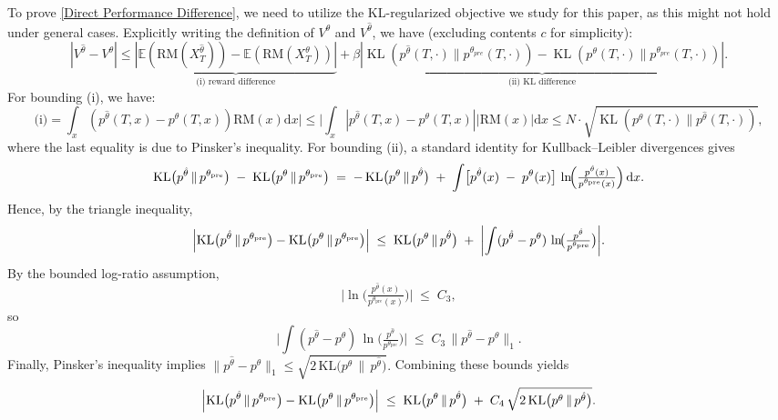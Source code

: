 \documentclass{article}
\theoremstyle{plain}
\theoremstyle{definition}
\theoremstyle{remark}
\begin{document}
To prove \eqref{Direct Performance Difference}, we need to utilize the KL-regularized objective we study for this paper, as this might not hold under general cases. Explicitly writing the definition of $V^{\theta}$ and $V^{\hat{\theta}}$, we have (excluding contents $c$ for simplicity):
$$
|V^{\hat{\theta}} - V^{\theta}|\leq \underbrace{|\mathbb{E}(\text{RM}(X^{\hat{\theta}}_T))-\mathbb{E}(\text{RM}(X^{\theta}_T))|}_{\text{(i) reward difference}}+\beta \underbrace{|\operatorname{KL}\left(p^{\hat{\theta}}(T,\cdot)\| p^{\theta_{pre}}(T,\cdot)\right)-\operatorname{KL}\left(p^{\theta}(T,\cdot)\| p^{\theta_{pre}}(T,\cdot)\right)|}_{\text{(ii) KL difference}}.
$$
For bounding (i), we have:
$$
\text{(i)} =\int_{x}(p^{\hat{\theta}}(T,x)-p^{\theta}(T,x))\text{RM}(x) \mathrm{d} x|\leq |\int_{x}|p^{\hat{\theta}}(T,x)-p^{\theta}(T,x)||\text{RM}(x)| \mathrm{d} x \leq N\cdot\sqrt{\operatorname{KL}\left(p^{\theta}(T,\cdot)\| p^{\hat{\theta}}(T,\cdot)\right)},
$$
where the last equality is due to Pinsker's inequality. For bounding (ii), a standard identity for Kullback--Leibler divergences gives
\[
  \mathrm{KL}\bigl(p^{\hat{\theta}} \,\|\, p^{\theta_{\mathrm{pre}}}\bigr)
  \;-\;
  \mathrm{KL}\bigl(p^{\theta} \,\|\, p^{\theta_{\mathrm{pre}}}\bigr)
  \;=\;
  -\,\mathrm{KL}\bigl(p^{\theta}\,\|\,p^{\hat{\theta}}\bigr)
  \;+\;
  \int \bigl[p^{\hat{\theta}}(x) \;-\; p^{\theta}(x)\bigr]
        \,\ln\!\Bigl(\tfrac{p^{\hat{\theta}}(x)}{p^{\theta_{\mathrm{pre}}}(x)}\Bigr)\,\mathrm{d}x.
\]
Hence, by the triangle inequality,
\[
  \Bigl|
     \mathrm{KL}\bigl(p^{\hat{\theta}} \,\|\, p^{\theta_{\mathrm{pre}}}\bigr)
     -
     \mathrm{KL}\bigl(p^{\theta}\,\|\,p^{\theta_{\mathrm{pre}}}\bigr)
  \Bigr|
  \;\le\;
  \mathrm{KL}\bigl(p^{\theta}\,\|\,p^{\hat{\theta}}\bigr)
  \;+\;
  \biggl|\int (p^{\hat{\theta}} - p^{\theta})\,
              \ln\!\bigl(\tfrac{p^{\hat{\theta}}}{p^{\theta_{\mathrm{pre}}}}\bigr)\biggr|.
\]
By the bounded log-ratio assumption,
\[
  \bigl|\ln\!\bigl(\tfrac{p^{\hat{\theta}}(x)}{p^{\theta_{\mathrm{pre}}}(x)}\bigr)\bigr|
  \;\le\;
  C_3,
\]
so
\[
  \biggl|\int (p^{\hat{\theta}} - p^{\theta})\,
               \ln\!\bigl(\tfrac{p^{\hat{\theta}}}{p^{\theta_{\mathrm{pre}}}}\bigr)\biggr|
  \;\le\;
  C_3 \,\|p^{\hat{\theta}} - p^{\theta}\|_1.
\]
Finally, Pinsker’s inequality implies
\(\|p^{\hat{\theta}} - p^{\theta}\|_1 \le \sqrt{2\,\mathrm{KL}\!\bigl(p^{\theta}\,\|\,p^{\hat{\theta}}\bigr)}.\)
Combining these bounds yields
\[
  \Bigl|
     \mathrm{KL}\bigl(p^{\hat{\theta}} \,\|\, p^{\theta_{\mathrm{pre}}}\bigr)
     -
     \mathrm{KL}\bigl(p^{\theta}\,\|\,p^{\theta_{\mathrm{pre}}}\bigr)
  \Bigr|
  \;\le\;
  \mathrm{KL}\bigl(p^{\theta}\,\|\,p^{\hat{\theta}}\bigr)
  \;+\;
  C_4\,\sqrt{2\,\mathrm{KL}\bigl(p^{\theta}\,\|\,p^{\hat{\theta}}\bigr)}.
\]
\end{document}
